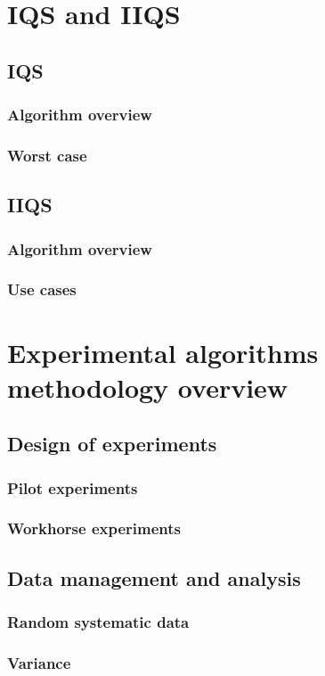 \documentclass{iccmemoria}
\begin{document}
\section{IQS and IIQS}

\subsection{IQS}
\subsubsection{Algorithm overview}
\subsubsection{Worst case}
\subsection{IIQS}
\subsubsection{Algorithm overview}
\subsubsection{Use cases}
\section{Experimental algorithms methodology overview}
\subsection{Design of experiments}
\subsubsection{Pilot experiments}
\subsubsection{Workhorse experiments}
\subsection{Data management and analysis}
\subsubsection{Random systematic data}
\subsubsection{Variance}
\end{document}
